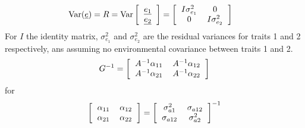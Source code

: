 \documentclass[12pt,a4paper]{paper}
\DeclareMathOperator{\var}{Var}
\begin{document}
\begin{equation}
\begin{split}
\var(\underline{e}) &=  R = \var\left[\begin{tabular}{c}$\underline{e_{1}}$\\$\underline{e_{2}}$\end{tabular}\right] = \left[\begin{tabular}{cc}$I\sigma^{2}_{e_{1}}$&0\\0&$I\sigma^{2}_{e_{2}}$\end{tabular}\right]
\end{split}
\end{equation}
For $I$ the identity matrix, $\sigma^{2}_{e_1}$ and $\sigma^{2}_{e_2}$ are the residual variances for traits 1 and 2 respectively, ans assuming no environmental covariance between traits 1 and 2.
\begin{equation}
G^{-1} = \left[\begin{tabular}{cc}$A^{-1}\alpha_{11}$ & $A^{-1}\alpha_{12}$\\$A^{-1}\alpha_{21}$ &$A^{-1}\alpha_{22}$\end{tabular}\right]
\end{equation}
for
\begin{equation}
\left[\begin{tabular}{cc}$\alpha_{11}$ &$\alpha_{12}$ \\$\alpha_{21}$ &$\alpha_{22}$\end{tabular}\right] = \left[\begin{tabular}{cc} $\sigma^{2}_{a1}$& $\sigma_{a12}$ \\ $\sigma_{a12}$ &$\sigma^{2}_{a2}$\end{tabular}\right]^{-1}
\end{equation}
\end{document}
